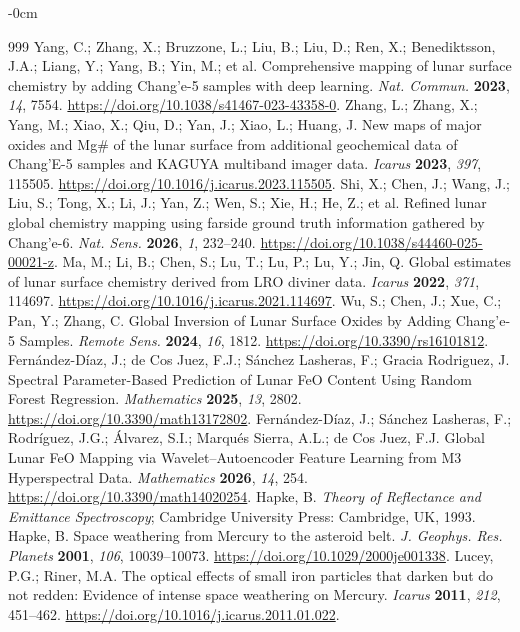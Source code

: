 \documentclass[remotesensing,article,submit,pdftex,moreauthors]{Definitions/mdpi}
\begin{document}
\begin{adjustwidth}{-\extralength}{0cm}
\begin{thebibliography}{999}
Yang, C.; Zhang, X.; Bruzzone, L.; Liu, B.; Liu, D.; Ren, X.; Benediktsson, J.A.; Liang, Y.; Yang, B.; Yin, M.; et al. Comprehensive mapping of lunar surface chemistry by adding Chang'e-5 samples with deep learning. \emph{Nat. Commun.} {\bf 2023}, \emph{14}, 7554. \url{https://doi.org/10.1038/s41467-023-43358-0}.
Zhang, L.; Zhang, X.; Yang, M.; Xiao, X.; Qiu, D.; Yan, J.; Xiao, L.; Huang, J. New maps of major oxides and Mg\# of the lunar surface from additional geochemical data of Chang'E-5 samples and KAGUYA multiband imager data. \emph{Icarus} {\bf 2023}, \emph{397}, 115505. \url{https://doi.org/10.1016/j.icarus.2023.115505}.
Shi, X.; Chen, J.; Wang, J.; Liu, S.; Tong, X.; Li, J.; Yan, Z.; Wen, S.; Xie, H.; He, Z.; et al. Refined lunar global chemistry mapping using farside ground truth information gathered by Chang'e-6. \emph{Nat. Sens.} {\bf 2026}, \emph{1}, 232--240. \url{https://doi.org/10.1038/s44460-025-00021-z}.
Ma, M.; Li, B.; Chen, S.; Lu, T.; Lu, P.; Lu, Y.; Jin, Q. Global estimates of lunar surface chemistry derived from LRO diviner data. \emph{Icarus} {\bf 2022}, \emph{371}, 114697. \url{https://doi.org/10.1016/j.icarus.2021.114697}.
Wu, S.; Chen, J.; Xue, C.; Pan, Y.; Zhang, C. Global Inversion of Lunar Surface Oxides by Adding Chang'e-5 Samples. \emph{Remote Sens.} {\bf 2024}, \emph{16}, 1812. \url{https://doi.org/10.3390/rs16101812}.
Fernández-Díaz, J.; de Cos Juez, F.J.; Sánchez Lasheras, F.; Gracia Rodriguez, J. Spectral Parameter-Based Prediction of Lunar FeO Content Using Random Forest Regression. \emph{Mathematics} {\bf 2025}, \emph{13}, 2802. \url{https://doi.org/10.3390/math13172802}.
Fernández-Díaz, J.; Sánchez Lasheras, F.; Rodríguez, J.G.; Álvarez, S.I.; Marqués Sierra, A.L.; de Cos Juez, F.J. Global Lunar FeO Mapping via Wavelet--Autoencoder Feature Learning from M3 Hyperspectral Data. \emph{Mathematics} {\bf 2026}, \emph{14}, 254. \url{https://doi.org/10.3390/math14020254}.
Hapke, B. \emph{Theory of Reflectance and Emittance Spectroscopy}; Cambridge University Press: Cambridge, UK, 1993.
Hapke, B. Space weathering from Mercury to the asteroid belt. \emph{J. Geophys. Res. Planets} {\bf 2001}, \emph{106}, 10039--10073. \url{https://doi.org/10.1029/2000je001338}.
Lucey, P.G.; Riner, M.A. The optical effects of small iron particles that darken but do not redden: Evidence of intense space weathering on Mercury. \emph{Icarus} {\bf 2011}, \emph{212}, 451--462. \url{https://doi.org/10.1016/j.icarus.2011.01.022}.

\end{thebibliography}
\end{adjustwidth}
\end{document}
